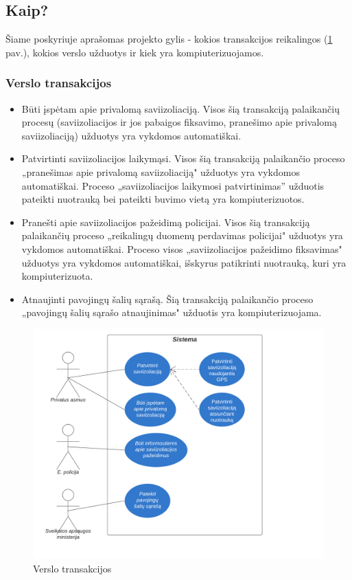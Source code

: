 \documentclass{VUMIFPSkursinis}
\begin{document}
\subsection{Kaip?}\label{sec:vartotojoReqHow}
Šiame poskyriuje aprašomas projekto gylis - kokios transakcijos reikalingos (\ref{img:business_transactions} pav.), kokios verslo užduotys ir kiek yra kompiuterizuojamos. 

\subsubsection{Verslo transakcijos}
\begin{itemize}
	\item Būti įspėtam apie privalomą saviizoliaciją. Visos šią transakciją palaikančių procesų (saviizoliacijos ir jos pabaigos fiksavimo, pranešimo apie privalomą saviizoliaciją) užduotys yra vykdomos automatiškai.
	\item Patvirtinti saviizoliacijos laikymąsi. Visos šią transakciją palaikančio proceso „pranešimas apie privalomą saviizoliaciją" užduotys yra vykdomos automatiškai. Proceso „saviizoliacijos laikymosi patvirtinimas'' užduotis pateikti nuotrauką bei pateikti buvimo vietą yra kompiuterizuotos.
	\item Pranešti apie saviizoliacijos pažeidimą policijai. Visos šią transakciją palaikančių proceso „reikalingų duomenų perdavimas policijai" užduotys yra vykdomos automatiškai. Proceso visos „saviizoliacijos pažeidimo fiksavimas" užduotys yra vykdomos automatiškai, išskyrus patikrinti nuotrauką, kuri yra kompiuterizuota.
	\item Atnaujinti pavojingų šalių sąrašą. Šią transakciją palaikančio proceso „pavojingų šalių sąrašo atnaujinimas" užduotis yra kompiuterizuojama.
\end{itemize}

\begin{figure}[H]
	\centering
	\includegraphics[scale=0.7]{img/use_case_diagram_user.png}
	\caption{Verslo transakcijos}
	\label{img:business_transactions}
\end{figure}
\end{document}
